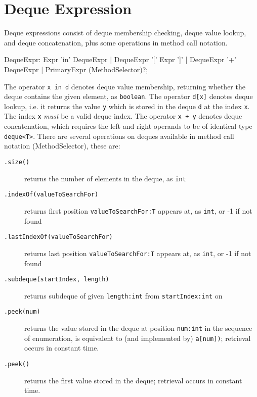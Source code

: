 \section{Deque Expression} \label{sec:dequeexpr}

Deque expressions consist of deque membership checking, deque value lookup, and deque concatenation, plus some operations in method call notation.

\begin{rail}
  DequeExpr: Expr 'in' DequeExpr | DequeExpr '[' Expr ']' | DequeExpr '+' DequeExpr | PrimaryExpr (MethodSelector)?;
\end{rail}

The operator \texttt{x in d} denotes deque value membership, returning whether the deque contains the given element, as \texttt{boolean}.
The operator \texttt{d[x]} denotes deque lookup, i.e. it returns the value \texttt{y} which is stored in the deque \texttt{d} at the index \texttt{x}.
The index \texttt{x} \emph{must} be a valid deque index.
The operator \texttt{x + y} denotes deque concatenation, which requires the left and right operands to be of identical type \verb#deque<T>#.
There are several operations on deques available in method call notation (MethodSelector), these are:

\begin{description}
\item[\texttt{.size()}] returns the number of elements in the deque, as \texttt{int}
\item[\texttt{.indexOf(valueToSearchFor)}] returns first position \texttt{valueToSearchFor:T} appears at, as \texttt{int}, or -1 if not found
\item[\texttt{.lastIndexOf(valueToSearchFor)}] returns last position \texttt{valueToSearchFor:T} appears at, as \texttt{int}, or -1 if not found
\item[\texttt{.subdeque(startIndex, length)}] returns subdeque of given \texttt{length:int} from \texttt{startIndex:int} on
\item[\texttt{.peek(num)}] returns the value stored in the deque at position \texttt{num:int} in the sequence of enumeration, is equivalent to (and implemented by) \texttt{a[num])}; retrieval occurs in constant time.
\item[\texttt{.peek()}] returns the first value stored in the deque; retrieval occurs in constant time.
\end{description}

